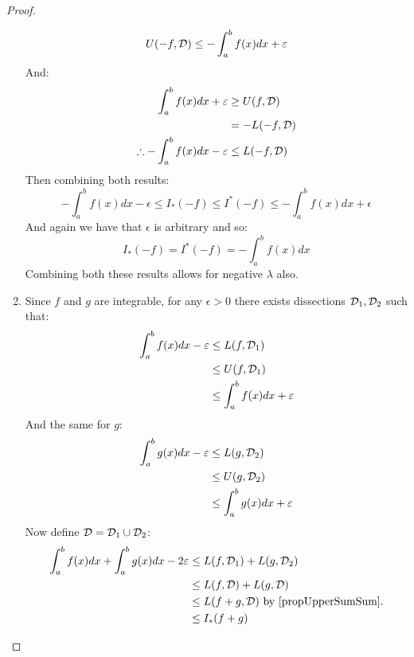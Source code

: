 \documentclass[../Main.tex]{subfiles}
\begin{document}
\begin{proof}
\begin{enumerate}
\begin{equation*}
                U(-f, \mathcal{D}) \leq -\int_a^b f(x) dx + \varepsilon
            \end{equation*}
            And:
            \begin{align*}
                \int_a^b f(x) dx + \varepsilon &\geq U(f, \mathcal{D}) \\
                &= -L(-f, \mathcal{D}) \\
                \therefore -\int_a^b f(x) dx - \varepsilon &\leq L(-f, \mathcal{D})
            \end{align*}
            Then combining both results:
            \begin{equation*}
                -\int_a^b f(x) dx - \epsilon \leq I_*(-f) \leq I^*(-f) \leq -\int_a^b f(x) dx + \epsilon
            \end{equation*}
            And again we have that $\epsilon$ is arbitrary and so:
            \begin{equation*}
                I_*(-f) = I^*(-f) = -\int_a^b f(x) dx
            \end{equation*}
            Combining both these results allows for negative $\lambda$ also.
        \item Since $f$ and $g$ are integrable, for any $\epsilon > 0$ there exists dissections $\mathcal{D}_1, \mathcal{D}_2$ such that:
            \begin{align*}
                \int_a^b f(x) dx - \varepsilon &\leq L(f, \mathcal{D}_1) \\
                &\leq U(f, \mathcal{D}_1) \\
                &\leq \int_a^b f(x) dx + \varepsilon
            \end{align*}
            And the same for $g$:
            \begin{align*}
                \int_a^b g(x) dx - \varepsilon &\leq L(g, \mathcal{D}_2) \\
                &\leq U(g, \mathcal{D}_2) \\
                &\leq \int_a^b g(x) dx + \varepsilon
            \end{align*}
            Now define $\mathcal{D} = \mathcal{D}_1 \cup \mathcal{D}_2$:
            \begin{align*}
                \int_a^b f(x) dx + \int_a^b g(x) dx - 2\epsilon &\leq L(f, \dissec_1) + L(g, \dissec_2) \\
                &\leq L(f, \dissec) + L(g, \dissec) \\
                &\leq L(f + g, \dissec) \text{ by \ref{propUpperSumSum}.} \\
                &\leq I_*(f + g)

\end{align*}
\end{enumerate}
\end{proof}
\end{document}
